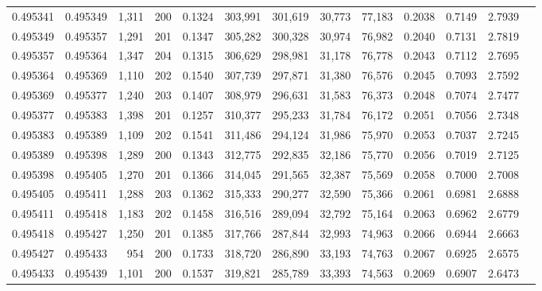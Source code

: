 \begin{tabular}{rrrrrrrrrrrrr}
0.495341 & 0.495349 & 1,311 & 200 &                                     0.1324 & 303,991 & 301,619 &  30,773 &  77,183 & 0.2038 & 0.7149 & 2.7939 \\
0.495349 & 0.495357 & 1,291 & 201 &                                     0.1347 & 305,282 & 300,328 &  30,974 &  76,982 & 0.2040 & 0.7131 & 2.7819 \\
0.495357 & 0.495364 & 1,347 & 204 &                                     0.1315 & 306,629 & 298,981 &  31,178 &  76,778 & 0.2043 & 0.7112 & 2.7695 \\
0.495364 & 0.495369 & 1,110 & 202 &                                     0.1540 & 307,739 & 297,871 &  31,380 &  76,576 & 0.2045 & 0.7093 & 2.7592 \\
0.495369 & 0.495377 & 1,240 & 203 &                                     0.1407 & 308,979 & 296,631 &  31,583 &  76,373 & 0.2048 & 0.7074 & 2.7477 \\
0.495377 & 0.495383 & 1,398 & 201 &                                     0.1257 & 310,377 & 295,233 &  31,784 &  76,172 & 0.2051 & 0.7056 & 2.7348 \\
0.495383 & 0.495389 & 1,109 & 202 &                                     0.1541 & 311,486 & 294,124 &  31,986 &  75,970 & 0.2053 & 0.7037 & 2.7245 \\
0.495389 & 0.495398 & 1,289 & 200 &                                     0.1343 & 312,775 & 292,835 &  32,186 &  75,770 & 0.2056 & 0.7019 & 2.7125 \\
0.495398 & 0.495405 & 1,270 & 201 &                                     0.1366 & 314,045 & 291,565 &  32,387 &  75,569 & 0.2058 & 0.7000 & 2.7008 \\
0.495405 & 0.495411 & 1,288 & 203 &                                     0.1362 & 315,333 & 290,277 &  32,590 &  75,366 & 0.2061 & 0.6981 & 2.6888 \\
0.495411 & 0.495418 & 1,183 & 202 &                                     0.1458 & 316,516 & 289,094 &  32,792 &  75,164 & 0.2063 & 0.6962 & 2.6779 \\
0.495418 & 0.495427 & 1,250 & 201 &                                     0.1385 & 317,766 & 287,844 &  32,993 &  74,963 & 0.2066 & 0.6944 & 2.6663 \\
0.495427 & 0.495433 &   954 & 200 &                                     0.1733 & 318,720 & 286,890 &  33,193 &  74,763 & 0.2067 & 0.6925 & 2.6575 \\
0.495433 & 0.495439 & 1,101 & 200 &                                     0.1537 & 319,821 & 285,789 &  33,393 &  74,563 & 0.2069 & 0.6907 & 2.6473 \\

\end{tabular}
